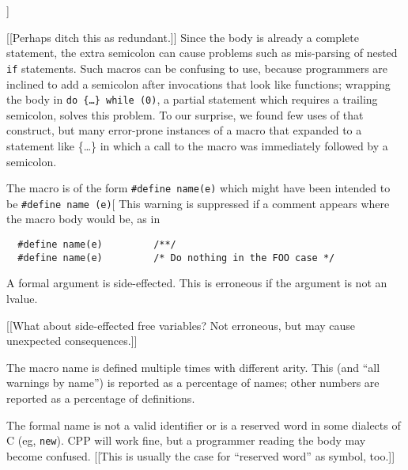 \begin{description}
        [[This, too, is more common than it looks, as it applies only to a
        small fraction (5.7\%) of macro definitions.]]

        [[Perhaps ditch this as redundant.]]
Since the body is already a complete statement, the
      extra semicolon can cause problems such as mis-parsing of nested {\tt
      if} statements.  Such macros can be confusing to use, because
    programmers are inclined to add a semicolon after invocations that look
    like functions; wrapping the body in {\tt do \{\ldots\} while (0)}, a
    partial statement which requires a trailing semicolon, solves this
    problem.  To our surprise, we found few uses of that construct, but
    many error-prone instances of a macro that expanded to a statement like
    \{\ldots\} in which a call to the macro was immediately followed by a
    semicolon.

\item[null body with arguments]
        The macro is of the form {\tt \#define name(e)} 
        which might have been intended to be {\tt \#define name (e)}[
        This warning is suppressed if a comment appears where the macro
        body would be, as in
\begin{verbatim}
  #define name(e)         /**/
  #define name(e)         /* Do nothing in the FOO case */
\end{verbatim}

\item[side-effected formal]
        A formal argument is side-effected.  This is erroneous if the
        argument is not an lvalue.

        [[What about side-effected free variables?  Not erroneous, but may
        cause unexpected consequences.]]

\item[inconsistent arity]
        The macro name is defined multiple times with different arity.
        This (and ``all warnings by name'') is reported as a percentage of
        names; other numbers are reported as a percentage of definitions.

\item[bad formal name]
        The formal name is not a valid identifier or is a reserved word in
        some dialects of C (eg, {\tt new}).  CPP will work fine, but a
        programmer reading the body may become confused.
        [[This is usually the case for ``reserved word'' as symbol, too.]]

\end{description}



